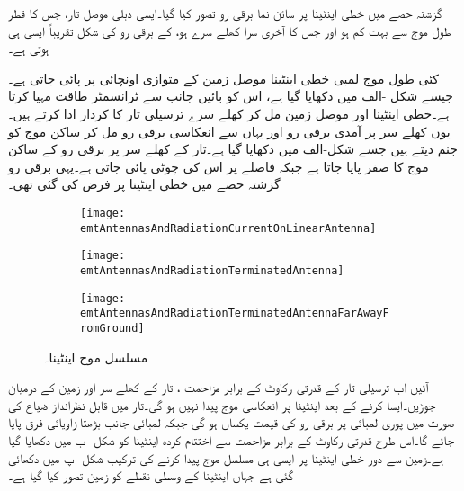 گزشتہ حصے میں خطی اینٹینا پر سائن نما برقی رو تصور کیا گیا۔ایسی دبلی موصل تار، جس کا قطر  طول موج  سے بہت کم ہو  اور جس کا آخری سرا کھلے سرے ہو، کے برقی رو کی شکل تقریباً ایسی ہی ہوتی ہے۔

کئی طول موج لمبی خطی اینٹینا موصل زمین کے متوازی  اونچائی پر پائی جاتی ہے۔ جیسے شکل -الف میں دکھایا گیا ہے، اس کو بائیں جانب سے ٹرانسمٹر طاقت مہیا کرتا ہے۔خطی اینٹینا اور موصل زمین مل کر کھلے سرے ترسیلی تار کا کردار ادا کرتے ہیں۔یوں کھلے سر پر آمدی برقی رو اور یہاں سے انعکاسی برقی رو مل کر ساکن موج کو جنم دیتے ہیں جسے شکل-الف میں دکھایا گیا ہے۔تار کے کھلے سر پر برقی رو کے ساکن موج کا صفر پایا جاتا ہے جبکہ   فاصلے پر اس کی چوٹی پائی جاتی ہے۔یہی برقی رو گزشتہ حصے میں خطی اینٹینا پر فرض کی گئی تھی۔

\begin{figure}
\centering
\begin{subfigure}{0.4\textwidth}
\centering
\texttt{[image: emtAntennasAndRadiationCurrentOnLinearAntenna]}
\end{subfigure}
\par\bigskip
\begin{subfigure}{0.4\textwidth}
\centering
\texttt{[image: emtAntennasAndRadiationTerminatedAntenna]}
\end{subfigure}
\par\bigskip
\begin{subfigure}{0.4\textwidth}
\centering
\texttt{[image: emtAntennasAndRadiationTerminatedAntennaFarAwayFromGround]}
\end{subfigure}
\caption{مسلسل موج اینٹینا۔}
\label{شکل_اینٹینا_موصل_سطح_خطی_اینٹینا_رو}
\end{figure}

آئیں اب ترسیلی تار کے قدرتی رکاوٹ کے برابر مزاحمت ،  تار کے کھلے سر اور زمین کے درمیان جوڑیں۔ایسا کرنے کے بعد اینٹینا پر انعکاسی موج پیدا نہیں ہو گی۔تار میں قابل نظرانداز ضیاع کی صورت میں پوری لمبائی پر برقی رو کی قیمت یکساں ہو گی جبکہ لمبائی جانب بڑھتا زاویائی فرق پایا جائے گا۔اس طرح قدرتی رکاوٹ کے برابر مزاحمت سے اختتام کردہ اینٹینا کو شکل -ب میں دکھایا گیا ہے۔زمین سے دور خطی اینٹینا پر ایسی ہی مسلسل موج پیدا کرنے کی ترکیب شکل -پ میں دکھائی گئی ہے جہاں  اینٹینا کے وسطی نقطے کو زمین تصور کیا گیا ہے۔

